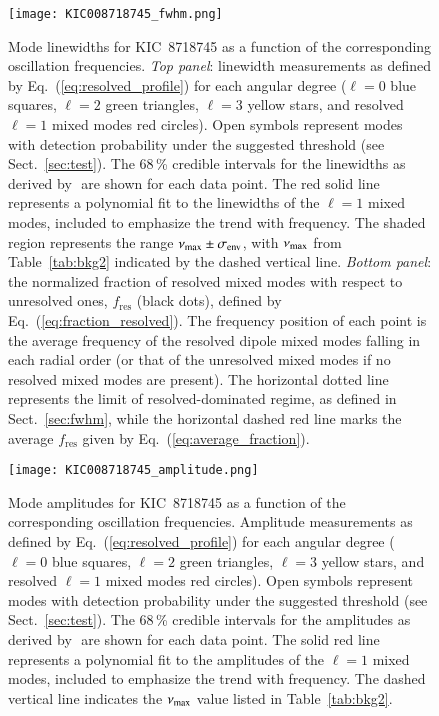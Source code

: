\begin{figure}
   \centering
   \texttt{[image: KIC008718745\_fwhm.png]}
      \caption{Mode linewidths for KIC~8718745 as a function of the corresponding oscillation frequencies. \textit{Top panel}: linewidth measurements as defined by Eq.~(\ref{eq:resolved_profile}) for each angular degree ($\ell = 0$ blue squares, $\ell = 2$ green triangles, $\ell = 3$ yellow stars, and resolved $\ell = 1$ mixed modes red circles). Open symbols represent modes with detection probability under the suggested threshold (see Sect.~\ref{sec:test}). The 68\,\% credible intervals for the linewidths as derived by \diamonds\,\,are shown for each data point. The red solid line represents a polynomial fit to the linewidths of the $\ell = 1$ mixed modes, included to emphasize the trend with frequency. The shaded region represents the range $\nu_\mathrm{max} \pm \sigma_\mathrm{env}$, with $\nu_\mathrm{max}$ from Table~\ref{tab:bkg2} indicated by the dashed vertical line. \textit{Bottom panel}: the normalized fraction of resolved mixed modes with respect to unresolved ones, $f_\mathrm{res}$ (black dots), defined by Eq.~(\ref{eq:fraction_resolved}). The frequency position of each point is the average frequency of the resolved dipole mixed modes falling in each radial order (or that of the unresolved mixed modes if no resolved mixed modes are present). The horizontal dotted line represents the limit of resolved-dominated regime, as defined in Sect.~\ref{sec:fwhm}, while the horizontal dashed red line marks the average $f_\mathrm{res}$ given by Eq.~(\ref{eq:average_fraction}).}
    \label{fig:8718745fwhm}
\end{figure}

\begin{figure}
   \centering
   \texttt{[image: KIC008718745\_amplitude.png]}
      \caption{Mode amplitudes for KIC~8718745 as a function of the corresponding oscillation frequencies. Amplitude measurements as defined by Eq.~(\ref{eq:resolved_profile}) for each angular degree ($\ell = 0$ blue squares, $\ell = 2$ green triangles, $\ell = 3$ yellow stars, and resolved $\ell = 1$ mixed modes red circles). Open symbols represent modes with detection probability under the suggested threshold (see Sect.~\ref{sec:test}). The 68\,\% credible intervals for the amplitudes as derived by \diamonds\,\,are shown for each data point. The solid red line represents a polynomial fit to the amplitudes of the $\ell = 1$ mixed modes, included to emphasize the trend with frequency. The dashed vertical line indicates the $\nu_\mathrm{max}$ value listed in Table~\ref{tab:bkg2}.}
    \label{fig:8718745amplitude}
\end{figure}
\clearpage

